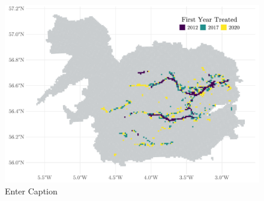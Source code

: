 \begin{figure}
    \centering
    \includegraphics[width=0.7\linewidth]{output/figures/beaver_first_year_treated.pdf}
    \caption{Enter Caption}
    \label{fig:enter-label}
\end{figure}


